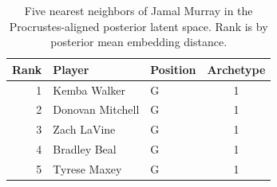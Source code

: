 \begin{table}[htbp]
  \centering\small
  \begin{tabular}{rllc}
    \toprule
    Rank & Player & Position & Archetype \\
    \midrule
    1 & Kemba Walker & G & 1 \\
    2 & Donovan Mitchell & G & 1 \\
    3 & Zach LaVine & G & 1 \\
    4 & Bradley Beal & G & 1 \\
    5 & Tyrese Maxey & G & 1 \\
    \bottomrule
  \end{tabular}
  \caption{Five nearest neighbors of Jamal Murray in the Procrustes-aligned posterior latent space. Rank is by posterior mean embedding distance.}
  \label{tab:Jamal_Murray_neighbors}
\end{table}

